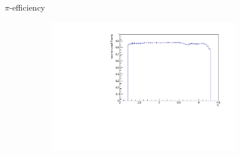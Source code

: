 \documentclass[11pt]{beamer}
\begin{document}
\begin{frame}{$\pi$-efficiency}
\begin{figure}
\begin{subfigure}{0.45\textwidth}
\end{subfigure}
\begin{subfigure}{0.45\textwidth}
\includegraphics[width=0.9\textwidth]{up_pdf/tot/h_eta_reco_Pi.pdf}
\end{subfigure}
\end{figure}
\end{frame}
\end{document}
